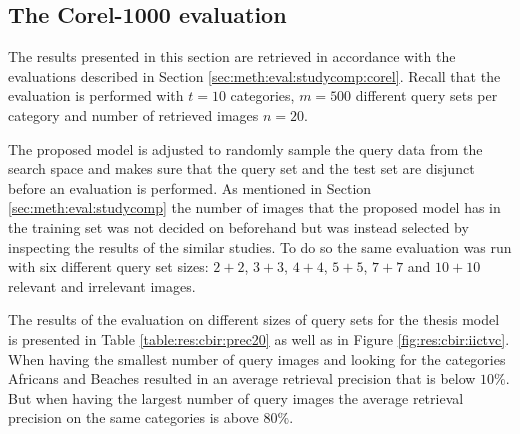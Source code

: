 \subsection{The Corel-1000 evaluation}
\label{sec:res:studycomp:corel}
The results presented in this section are retrieved in accordance with the evaluations described in Section \ref{sec:meth:eval:studycomp:corel}. Recall that the evaluation is performed with $t=10$ categories, $m=500$ different query sets per category and number of retrieved images $n=20$.

The proposed model is adjusted to randomly sample the query data from the search space and makes sure that the query set and the test set are disjunct before an evaluation is performed. As mentioned in Section \ref{sec:meth:eval:studycomp} the number of images that the proposed model has in the training set was not decided on beforehand but was instead selected by inspecting the results of the similar studies. To do so the same evaluation was run with six different query set sizes: $2+2$, $3+3$, $4+4$, $5+5$, $7+7$ and $10+10$ relevant and irrelevant images. 


The results of the evaluation on different sizes of query sets for the thesis model is presented in Table \ref{table:res:cbir:prec20} as well as in Figure \ref{fig:res:cbir:iictvc}. When having the smallest number of query images and looking for the categories Africans and Beaches resulted in an average retrieval precision that is below $10\%$. But when having the largest number of query images the average retrieval precision on the same categories is above $80\%$.


